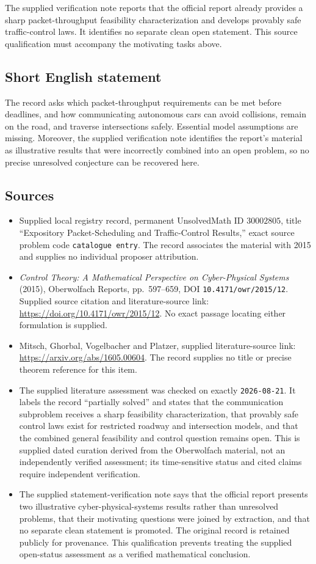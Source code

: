 \documentclass[11pt]{article}
\begin{document}
The supplied verification note reports that the official report already provides a sharp packet-throughput feasibility characterization and develops provably safe traffic-control laws. It identifies no separate clean open statement. This source qualification must accompany the motivating tasks above.
\subsection{Short English statement}
The record asks which packet-throughput requirements can be met before deadlines, and how communicating autonomous cars can avoid collisions, remain on the road, and traverse intersections safely. Essential model assumptions are missing. Moreover, the supplied verification note identifies the report's material as illustrative results that were incorrectly combined into an open problem, so no precise unresolved conjecture can be recovered here.
\subsection{Sources}
\begin{itemize}
\item Supplied local registry record, permanent UnsolvedMath ID \(30002805\), title ``Expository Packet-Scheduling and Traffic-Control Results,'' exact source problem code \texttt{catalogue entry}. The record associates the material with 2015 and supplies no individual proposer attribution.
\item \emph{Control Theory: A Mathematical Perspective on Cyber-Physical Systems} (2015), Oberwolfach Reports, pp.\ 597--659, DOI \texttt{10.4171/owr/2015/12}. Supplied source citation and literature-source link: \url{https://doi.org/10.4171/owr/2015/12}. No exact passage locating either formulation is supplied.
\item Mitsch, Ghorbal, Vogelbacher and Platzer, supplied literature-source link: \url{https://arxiv.org/abs/1605.00604}. The record supplies no title or precise theorem reference for this item.
\item The supplied literature assessment was checked on exactly \texttt{2026-08-21}. It labels the record ``partially solved'' and states that the communication subproblem receives a sharp feasibility characterization, that provably safe control laws exist for restricted roadway and intersection models, and that the combined general feasibility and control question remains open. This is supplied dated curation derived from the Oberwolfach material, not an independently verified assessment; its time-sensitive status and cited claims require independent verification.
\item The supplied statement-verification note says that the official report presents two illustrative cyber-physical-systems results rather than unresolved problems, that their motivating questions were joined by extraction, and that no separate clean statement is promoted. The original record is retained publicly for provenance. This qualification prevents treating the supplied open-status assessment as a verified mathematical conclusion.
\end{itemize}
\end{document}
